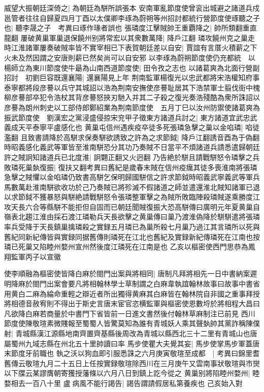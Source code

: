 威望大振朝廷深倚之|{
	為朝廷為駢所誤張本}
安南軍亂節度使曾衮出城避之諸道兵戍邕管者往往自歸夏四月丁酉以太僕卿李琢為蔚朔等州招討都統行營節度使琢聽之子也|{
	聽李晟之子　考異曰琢作瑑者誤也}
張璘度江擊賊帥王重覇降之|{
	帥所類翻重直龍翻}
屢破黄巢軍巢退保饒州别將常宏以其衆數萬降|{
	降戶江翻}
璘攻饒州克之巢走時江淮諸軍屢奏破賊率皆不實宰相已下表賀朝廷差以自安|{
	賈誼有言厝火積薪之下火未及然因謂之安唐則薪已然矣尚可以自安邪}
以李琢為蔚朔節度使仍充都統　以楊師立為東川節度使牛朂為山南西道節度使|{
	田令孜之志也}
以諸葛爽為北面行營副招討　初劉巨容既還襄陽|{
	還襄陽見上年}
荆南監軍楊復光以忠武都將宋浩權知府事泰寧都將段彦謩以兵守其城詔以浩為荆南安撫使彦謩耻居其下浩禁軍士翦伐街中槐柳彦謩部卒犯令浩杖其背彦謩怒挾刃馳入并其二子殺之復光奏浩殘酷為衆所誅詔以彦謩為朗州刺史以工部侍郎鄭紹業為荆南節度使　五月丁巳以汝州防禦使諸葛爽為振武節度使　劉漢宏之黨浸盛侵掠宋兖甲子徵東方諸道兵討之|{
	東方諸道宜武忠武義成天平泰寧平盧感化也}
黄巢屯信州遇疾疫卒徒多死張璘急擊之巢以金啗璘|{
	啗徒濫翻}
且致書請降於高駢求保奏駢欲誘致之許為之求節鉞|{
	降戶江翻誘音酉為于偽翻}
時昭義感化義武等軍皆至淮南駢恐分其功乃奏賊不日當平不煩諸道兵請悉遣歸朝廷許之賊詗知諸道兵已北度淮|{
	詗翾正翻又火迥翻}
乃告絶於駢且請戰駢怒令璘擊之兵敗璘死巢埶復振|{
	復扶又翻考異曰舊紀是歲春末賊在信州疫癘其徒多喪淮南將張璘急擊之賊懼以金啗璘仍致書高駢乞保明歸國駢信之許求節鉞時昭義武寧義武等軍兵馬數萬赴淮南駢欲收功於己乃奏賊已將殄滅不假諸道之師並遣還淮北賊知諸軍已退以求節鉞不獲暴怒與駢絶請戰駢怒令張璘整軍擊之為賊所敗臨陣殺璘賊遂乘勝度江攻天長六合等縣駢不能拒但自固而已朝廷聞賊復振大恐高駢傳曰廣明元年夏黄巢自嶺表北趨江淮由採石渡江璘勒兵天長欲擊之黄巢傳曰巢乃渡淮偽降於駢駢遣將張璘率兵受降于天長鎮巢擒璘殺之實録五月璘已為巢所殺七月巢乃過江其言璘所以死與舊紀同新紀傳皆與實録同据舊傳則璘死在江北也舊紀及實録新紀傳璘死在江南也按璘已死巢又陷睦州婺州宣州然後度江璘死在江南是也}
乙亥以樞密使西門思恭為鳳翔監軍丙子以宣徽

使李順融為樞密使皆降白麻於閤門出案與將相同|{
	唐制凡拜將相先一日中書納案遲明降麻於閤門出案會要凡將相翰林學士草制謂之白麻韋執誼翰林故事曰故事中書省用黄白二麻為綸命重輕之辯近者所出獨得黄麻其白麻皆在翰林院自非國之重事拜授將相德音赦宥則不得出于斯史言唐末宦官恣横監軍與樞密使恩數埒於將相程大昌曰凡欲降白麻若商量於中書門下省皆前一日進文書然後付翰林草麻制注已前見}
西川節度使陳敬瑄素微賤報至蜀蜀人皆驚莫知為誰有青城妖人乘其聲埶帥其黨詐稱陳僕射|{
	青城縣漢江源縣地南齊置齊基縣後周改為青城以縣西北三十二里有青城山也唐屬蜀州九域志縣在州北五十里帥讀曰率}
馬步使瞿大夫覺其妄|{
	馬步使掌馬步軍蓋唐末節度牙前職也}
執之沃以狗血即引服悉誅之六月庚寅敬瑄至成都　|{
	考異曰錦里耆舊傳云敬瑄九月二十五日上任按實録敬瑄除西川在三月庚午又雲南事狀敬瑄與市爕以下牒云某謬膺朝寄獲授藩條以六月八日到鎮上訖今從之}
黄巢别將陷睦州婺州|{
	睦婺相去一百八十里}
盧病風不能行謁告|{
	謁告謂請假居私第養疾也}
己亥始入對

